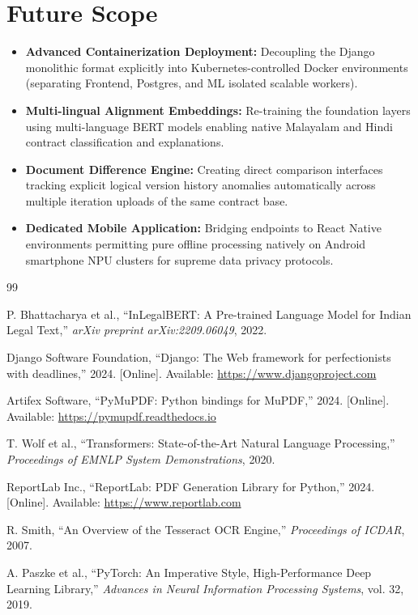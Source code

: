 \documentclass[a4paper,12pt]{report}
\begin{document}
\section{Future Scope}

\begin{itemize}
    \item \textbf{Advanced Containerization Deployment:} Decoupling the Django monolithic format explicitly into Kubernetes-controlled Docker environments (separating Frontend, Postgres, and ML isolated scalable workers).
    \item \textbf{Multi-lingual Alignment Embeddings:} Re-training the foundation layers using multi-language BERT models enabling native Malayalam and Hindi contract classification and explanations.
    \item \textbf{Document Difference Engine:} Creating direct comparison interfaces tracking explicit logical version history anomalies automatically across multiple iteration uploads of the same contract base. 
    \item \textbf{Dedicated Mobile Application:} Bridging endpoints to React Native environments permitting pure offline processing natively on Android smartphone NPU clusters for supreme data privacy protocols.
\end{itemize}

\newpage
{}
\begin{thebibliography}{99}

P. Bhattacharya et al., ``InLegalBERT: A Pre-trained Language Model for Indian Legal Text,'' \textit{arXiv preprint arXiv:2209.06049}, 2022.

Django Software Foundation, ``Django: The Web framework for perfectionists with deadlines,'' 2024. [Online]. Available: \url{https://www.djangoproject.com}

Artifex Software, ``PyMuPDF: Python bindings for MuPDF,'' 2024. [Online]. Available: \url{https://pymupdf.readthedocs.io}

T. Wolf et al., ``Transformers: State-of-the-Art Natural Language Processing,'' \textit{Proceedings of EMNLP System Demonstrations}, 2020.

ReportLab Inc., ``ReportLab: PDF Generation Library for Python,'' 2024. [Online]. Available: \url{https://www.reportlab.com}

R. Smith, ``An Overview of the Tesseract OCR Engine,'' \textit{Proceedings of ICDAR}, 2007.

A. Paszke et al., ``PyTorch: An Imperative Style, High-Performance Deep Learning Library,'' \textit{Advances in Neural Information Processing Systems}, vol. 32, 2019.

\end{thebibliography}
\end{document}
